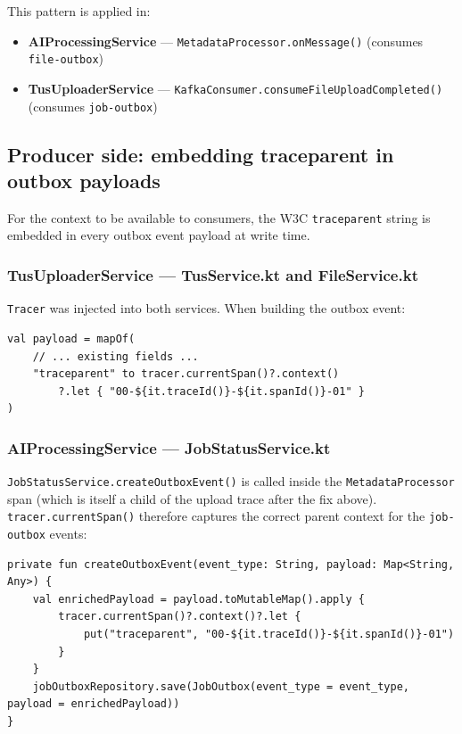 \documentclass[11pt,a4paper]{article}
\begin{document}
This pattern is applied in:
\begin{itemize}[noitemsep]
  \item \textbf{AIProcessingService} --- \texttt{MetadataProcessor.onMessage()}
        (consumes \texttt{file-outbox})
  \item \textbf{TusUploaderService} --- \texttt{KafkaConsumer.consumeFileUploadCompleted()}
        (consumes \texttt{job-outbox})
\end{itemize}

\subsection{Producer side: embedding traceparent in outbox payloads}

For the context to be available to consumers, the W3C \texttt{traceparent}
string is embedded in every outbox event payload at write time.

\subsubsection{TusUploaderService --- TusService.kt and FileService.kt}

\texttt{Tracer} was injected into both services.  When building the outbox
event:

\begin{lstlisting}[style=kotlin, caption={FILE\_INSERTED / FILE\_DELETED outbox payload}]
val payload = mapOf(
    // ... existing fields ...
    "traceparent" to tracer.currentSpan()?.context()
        ?.let { "00-${it.traceId()}-${it.spanId()}-01" }
)
\end{lstlisting}

\subsubsection{AIProcessingService --- JobStatusService.kt}

\texttt{JobStatusService.createOutboxEvent()} is called inside the
\texttt{MetadataProcessor} span (which is itself a child of the upload trace
after the fix above).  \texttt{tracer.currentSpan()} therefore captures the
correct parent context for the \texttt{job-outbox} events:

\begin{lstlisting}[style=kotlin, caption={JobStatusService.kt --- createOutboxEvent()}]
private fun createOutboxEvent(event_type: String, payload: Map<String, Any>) {
    val enrichedPayload = payload.toMutableMap().apply {
        tracer.currentSpan()?.context()?.let {
            put("traceparent", "00-${it.traceId()}-${it.spanId()}-01")
        }
    }
    jobOutboxRepository.save(JobOutbox(event_type = event_type, payload = enrichedPayload))
}
\end{lstlisting}
\end{document}
